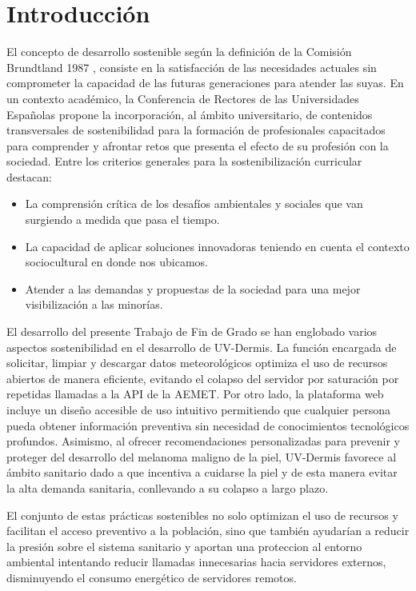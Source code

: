 
\section{Introducción}
El concepto de desarrollo sostenible según la definición de la Comisión Brundtland 1987 \cite{CRUE2012}, consiste en la satisfacción de las necesidades actuales sin comprometer la capacidad de las futuras generaciones para atender las suyas.
En un contexto académico, la Conferencia de Rectores de las Universidades Españolas \cite{CRUE2012} propone la incorporación, al ámbito universitario,  de contenidos transversales de sostenibilidad para la formación de profesionales capacitados para comprender y afrontar retos que presenta el efecto de su profesión con la sociedad. Entre los criterios generales para la sostenibilización curricular destacan:
\begin{itemize}
    \item La comprensión crítica de los desafíos ambientales y sociales que van surgiendo a medida que pasa el tiempo.
    \item La capacidad de aplicar soluciones innovadoras teniendo en cuenta el contexto sociocultural en donde nos ubicamos.
    \item Atender a las demandas y propuestas de la sociedad para una mejor visibilización a las minorías.
\end{itemize}

El desarrollo del presente Trabajo de Fin de Grado se han englobado varios aspectos sostenibilidad en el desarrollo de UV-Dermis. La función encargada de solicitar, limpiar y descargar datos meteorológicos optimiza el uso de recursos abiertos de manera eficiente, evitando el colapso del servidor por saturación por repetidas llamadas a la API de la AEMET.
Por otro lado, la plataforma web incluye un diseño accesible de uso intuitivo permitiendo que cualquier persona pueda obtener información preventiva sin necesidad de conocimientos tecnológicos profundos. Asimismo, al ofrecer recomendaciones personalizadas para prevenir y proteger del desarrollo del melanoma maligno de la piel, UV-Dermis favorece al ámbito sanitario dado a que incentiva a cuidarse la piel y de esta manera evitar la alta demanda sanitaria, conllevando a su colapso a largo plazo. 

El conjunto de estas prácticas sostenibles no solo optimizan el uso de recursos y facilitan el acceso preventivo a la población, sino que también ayudarían a reducir la presión sobre el sistema sanitario y aportan una proteccion al entorno ambiental intentando reducir llamadas innecesarias hacia servidores externos, disminuyendo el consumo energético de servidores remotos.